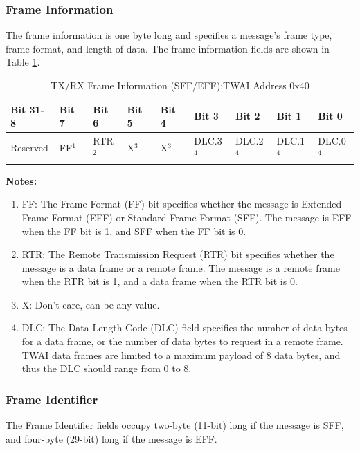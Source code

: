 \documentclass[main\_\_EN.tex]{subfiles}
\begin{document}
\subsubsection{Frame Information}
The frame information is one byte long and specifies a message's frame type, frame format, and length of data. The frame information fields are shown in Table \ref{tab:twai-tx-rx-frame-info-sff-eff}.

\begin{longtable}[c]{|p{1.4cm}|p{1.4cm}|p{1.4cm}|p{1.4cm}|p{1.4cm}|p{1.4cm}|p{1.4cm}|p{1.4cm}|p{1.4cm}|}
    \caption{TX/RX Frame Information (SFF/EFF);TWAI Address 0x40}
    \label{tab:twai-tx-rx-frame-info-sff-eff}\\
    \hline
       \rowcolor{lightgray}
    \textbf{Bit 31-8} & \textbf{Bit 7} & \textbf{Bit 6} & \textbf{Bit 5} & \textbf{Bit 4} & \textbf{Bit 3} & \textbf{Bit 2} & \textbf{Bit 1} & \textbf{Bit 0}\\\hline
    Reserved & FF$^1$ & RTR$^2$  & X$^3$  & X$^3$  & DLC.3$^4$ & DLC.2$^4$ & DLC.1$^4$ & DLC.0$^4$\\
    \hline
\end{longtable}
\vspace{-1.5em}
{\bfseries Notes:}\\
\begin{enumerate}
    \item FF: The Frame Format (FF) bit specifies whether the message is Extended Frame Format (EFF) or Standard Frame Format (SFF). The message is EFF when the FF bit is 1, and SFF when the FF bit is 0.
    \item RTR: The Remote Transmission Request (RTR) bit specifies whether the message is a data frame or a remote frame. The message is a remote frame when the RTR bit is 1, and a data frame when the RTR bit is 0.
    \item X: Don't care, can be any value.
    \item DLC: The Data Length Code (DLC) field specifies the number of data bytes for a data frame, or the number of data bytes to request in a remote frame. TWAI data frames are limited to a maximum payload of 8 data bytes, and thus the DLC should range from 0 to 8.
\end{enumerate}


\subsubsection{Frame Identifier}
The Frame Identifier fields occupy two-byte (11-bit) long if the message is SFF, and four-byte (29-bit) long if the message is EFF.
\end{document}
